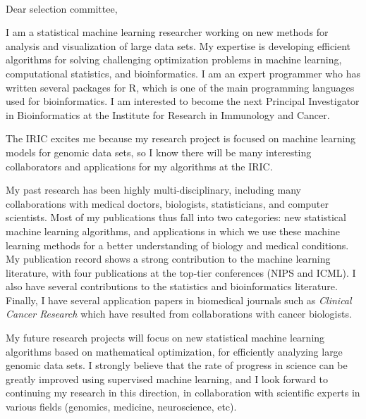 \documentclass{article}
\begin{document}
\mbox{ }

Dear selection committee,

I am a statistical machine learning researcher working on new methods
for analysis and visualization of large 
data sets.
My expertise is developing
efficient algorithms for solving challenging optimization problems in
machine learning, computational statistics, and bioinformatics. I am
an expert programmer who has written several packages for R, which is
one of the main programming languages used for bioinformatics. I am
interested to become the next Principal Investigator in Bioinformatics at
the Institute for Research in Immunology and Cancer.

The IRIC excites me because my research project is
focused on machine learning models for genomic data sets, so I know
there will be many interesting collaborators and applications for my
algorithms at the IRIC. 

My past research has been highly multi-disciplinary, including many
collaborations with 
medical doctors,
biologists, 
statisticians,
and computer scientists.
Most of my
publications thus fall into two categories: new statistical machine
learning algorithms, and applications in which we use these machine
learning methods for a better understanding of 
biology and medical conditions. 
My publication record shows a strong
contribution to the machine learning literature, with four
publications at the top-tier conferences (NIPS and ICML). I also have
several contributions to the statistics 
and bioinformatics 
literature.
Finally, I have several application papers in biomedical journals such
as {\it Clinical Cancer Research} which have resulted from
collaborations with cancer biologists. 

My future research projects will focus on new statistical machine
learning algorithms based on mathematical optimization, for
efficiently analyzing large genomic data sets. I strongly believe that the
rate of progress in science can be greatly improved using supervised
machine learning, and I look forward to continuing my research in this
direction, in collaboration with scientific experts in various fields
(genomics, medicine, neuroscience, etc). 
\end{document}
